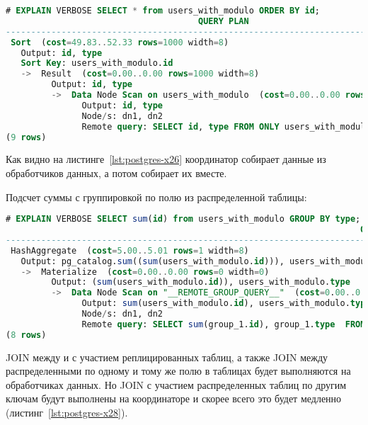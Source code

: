 \begin{lstlisting}[language=SQL,label=lst:postgres-x26,caption=Выборка записей из распределенной таблицы]
# EXPLAIN VERBOSE SELECT * from users_with_modulo ORDER BY id;
                                      QUERY PLAN
--------------------------------------------------------------------------------------
 Sort  (cost=49.83..52.33 rows=1000 width=8)
   Output: id, type
   Sort Key: users_with_modulo.id
   ->  Result  (cost=0.00..0.00 rows=1000 width=8)
         Output: id, type
         ->  Data Node Scan on users_with_modulo  (cost=0.00..0.00 rows=1000 width=8)
               Output: id, type
               Node/s: dn1, dn2
               Remote query: SELECT id, type FROM ONLY users_with_modulo WHERE true
(9 rows)
\end{lstlisting}

Как видно на листинге~\ref{lst:postgres-x26} координатор собирает данные из обработчиков данных, а потом собирает их вместе.

Подсчет суммы с группировкой по полю из распределенной таблицы:

\begin{lstlisting}[language=SQL,label=lst:postgres-x27,caption=Выборка записей из распределенной таблицы]
# EXPLAIN VERBOSE SELECT sum(id) from users_with_modulo GROUP BY type;
                                                                      QUERY PLAN
------------------------------------------------------------------------------------------------------------------------------------------------------
 HashAggregate  (cost=5.00..5.01 rows=1 width=8)
   Output: pg_catalog.sum((sum(users_with_modulo.id))), users_with_modulo.type
   ->  Materialize  (cost=0.00..0.00 rows=0 width=0)
         Output: (sum(users_with_modulo.id)), users_with_modulo.type
         ->  Data Node Scan on "__REMOTE_GROUP_QUERY__"  (cost=0.00..0.00 rows=1000 width=8)
               Output: sum(users_with_modulo.id), users_with_modulo.type
               Node/s: dn1, dn2
               Remote query: SELECT sum(group_1.id), group_1.type  FROM (SELECT id, type FROM ONLY users_with_modulo WHERE true) group_1 GROUP BY 2
(8 rows)
\end{lstlisting}

JOIN между и с участием реплицированных таблиц, а также JOIN между распределенными по одному и тому же полю в таблицах будет выполняются на обработчиках данных. Но JOIN с участием распределенных таблиц по другим ключам будут выполнены на координаторе и скорее всего это будет медленно (листинг~\ref{lst:postgres-x28}).

